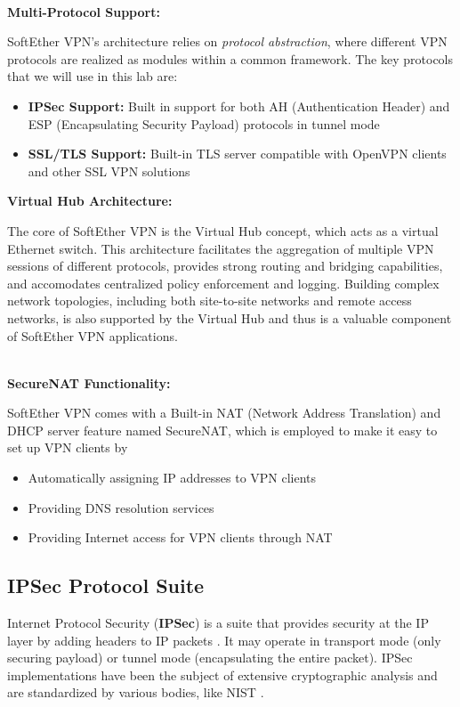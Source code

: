 \noindent
\\
\textbf{Multi-Protocol Support:}

\noindent
SoftEther VPN's architecture relies on \textit{protocol abstraction}, where different VPN protocols are realized as modules within a common framework. The key protocols that we will use in this lab are:

\begin{itemize}
    \item \textbf{IPSec Support:} Built in support for both AH (Authentication Header) and ESP (Encapsulating Security Payload) protocols in tunnel mode
    \item \textbf{SSL/TLS Support:} Built-in TLS server compatible with OpenVPN clients and other SSL VPN solutions
\end{itemize}

\noindent
\textbf{Virtual Hub Architecture:}

\noindent
The core of SoftEther VPN is the Virtual Hub concept, which acts as a virtual Ethernet switch. This architecture facilitates the aggregation of multiple VPN sessions of different protocols, provides strong routing and bridging capabilities, and accomodates centralized policy enforcement and logging. Building complex network topologies, including both site-to-site networks and remote access networks, is also supported by the Virtual Hub and thus is a valuable component of SoftEther VPN applications.

\noindent
\\
\textbf{SecureNAT Functionality:}

\noindent
SoftEther VPN comes with a Built-in NAT (Network Address Translation) and DHCP server feature named SecureNAT, which is employed to make it easy to set up VPN clients by

\begin{itemize}
    \item Automatically assigning IP addresses to VPN clients
    \item Providing DNS resolution services
    \item Providing Internet access for VPN clients through NAT
\end{itemize}

\subsection{IPSec Protocol Suite}

Internet Protocol Security (\textbf{IPSec}) is a suite that provides security at the IP layer by adding headers to IP packets \cite{rfc4301}. It may operate in transport mode (only securing payload) or tunnel mode (encapsulating the entire packet). IPSec implementations have been the subject of extensive cryptographic analysis \cite{ferguson_ipsec} and are standardized by various bodies, like NIST \cite{nist_vpn_guide}.

